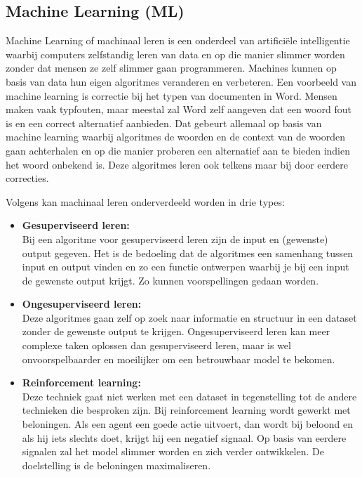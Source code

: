 \subsection{Machine Learning (ML)}
\label{subsec:begrippen-ml}


Machine Learning of machinaal leren is een onderdeel van artificiële intelligentie waarbij computers zelfstandig leren van data en op die manier slimmer worden zonder dat mensen ze zelf slimmer gaan programmeren. Machines kunnen op basis van data hun eigen algoritmes veranderen en verbeteren. Een voorbeeld van machine learning is correctie bij het typen van documenten in Word. Mensen maken vaak typfouten, maar meestal zal Word zelf aangeven dat een woord fout is en een correct alternatief aanbieden. Dat gebeurt allemaal op basis van machine learning waarbij algoritmes de woorden en de context van de woorden gaan achterhalen en op die manier proberen een alternatief aan te bieden indien het woord onbekend is. Deze algoritmes leren ook telkens maar bij door eerdere correcties.


Volgens \textcite{Lievens2019} kan machinaal leren onderverdeeld worden in drie types:

\begin{itemize}
    \item \textbf{Gesuperviseerd leren:} \\
    
    Bij een algoritme voor gesuperviseerd leren zijn de input en (gewenste) output gegeven. Het is de bedoeling dat de algoritmes een samenhang tussen input en output vinden en zo een functie ontwerpen waarbij je bij een input de gewenste output krijgt. Zo kunnen voorspellingen gedaan worden. \\
    
    \item \textbf{Ongesuperviseerd leren:} \\
    
    Deze algoritmes gaan zelf op zoek naar informatie en structuur in een dataset zonder de gewenste output te krijgen. Ongesuperviseerd leren kan meer complexe taken oplossen dan gesuperviseerd leren, maar is wel onvoorspelbaarder en moeilijker om een betrouwbaar model te bekomen. \\
    
    \item \textbf{Reinforcement learning:} \\
    
    Deze techniek gaat niet werken met een dataset in tegenstelling tot de andere technieken die besproken zijn. Bij reinforcement learning wordt gewerkt met beloningen. Als een agent een goede actie uitvoert, dan wordt bij beloond en als hij iets slechts doet, krijgt hij een negatief signaal. Op basis van eerdere signalen zal het model slimmer worden en zich verder ontwikkelen. De doelstelling is de beloningen maximaliseren. \\
\end{itemize}

